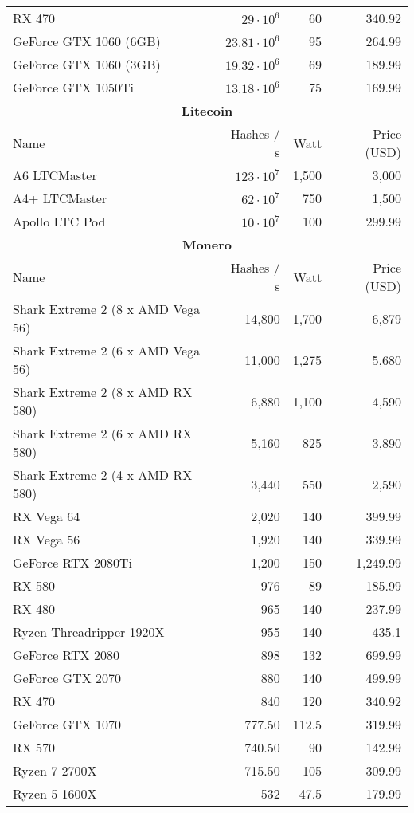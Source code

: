 \begin{longtable}{|p{}|r|r|r|}
  RX 470 & $29 \cdot 10^{6}$ & 60 & 340.92 \\
  GeForce GTX 1060 (6GB) & $23.81 \cdot 10^{6}$ & 95 & 264.99 \\
  GeForce GTX 1060 (3GB) & $19.32 \cdot 10^{6}$ & 69 & 189.99 \\
  GeForce GTX 1050Ti & $13.18 \cdot 10^{6}$ & 75 & 169.99 \\
  \hline
  \multicolumn{4}{|c|}{\textbf{Litecoin}} \\
  \hline
  Name & Hashes / s & Watt & Price (USD) \\
  \hhline{|=|=|=|=|}
  A6 LTCMaster & $123 \cdot 10^{7}$ & 1,500 & 3,000 \\
  A4+ LTCMaster & $62 \cdot 10^{7}$ & 750 & 1,500 \\
  Apollo LTC Pod & $10 \cdot 10^{7}$ & 100 & 299.99 \\
  \hline
  \hline
  \multicolumn{4}{|c|}{\textbf{Monero}} \\
  \hline
  Name & Hashes / s & Watt & Price (USD) \\
  \hhline{|=|=|=|=|}
  Shark Extreme 2 (8 x AMD Vega 56) & 14,800 & 1,700 & 6,879 \\
  Shark Extreme 2 (6 x AMD Vega 56) & 11,000 & 1,275 & 5,680 \\
  Shark Extreme 2 (8 x AMD RX 580) & 6,880 & 1,100 & 4,590 \\
  Shark Extreme 2 (6 x AMD RX 580) & 5,160 & 825 & 3,890 \\
  Shark Extreme 2 (4 x AMD RX 580) & 3,440 & 550 & 2,590 \\
  RX Vega 64 & 2,020 & 140 & 399.99 \\
  RX Vega 56 & 1,920 & 140 & 339.99 \\
  GeForce RTX 2080Ti & 1,200 & 150 & 1,249.99 \\
  RX 580 & 976 & 89 & 185.99 \\
  RX 480 & 965 & 140 & 237.99 \\
  Ryzen Threadripper 1920X & 955 & 140 & 435.1 \\
  GeForce RTX 2080 & 898 & 132 & 699.99 \\
  GeForce GTX 2070 & 880 & 140 & 499.99 \\
  RX 470 & 840 & 120 & 340.92 \\
  GeForce GTX 1070 & 777.50 & 112.5 & 319.99 \\
  RX 570 & 740.50 & 90 & 142.99 \\
  Ryzen 7 2700X & 715.50 & 105 & 309.99 \\
  Ryzen 5 1600X & 532 & 47.5 & 179.99 \\

\end{longtable}
